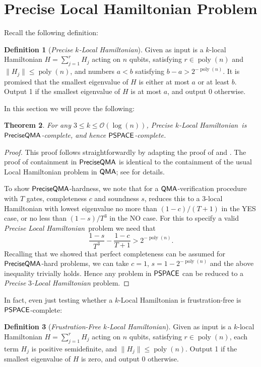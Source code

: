 \documentclass[11pt]{article}
\newtheorem{theorem}{Theorem}
\theoremstyle{definition}
\newtheorem{definition}[theorem]{Definition}
\theoremstyle{remark}
\newcommand\QMA{{\sf{QMA}}}
\newcommand\PSPACE{{\sf{PSPACE}}}
\newcommand\preciseQMA{{\sf{PreciseQMA}}}
\newcommand\preciselh{\textit{Precise Local Hamiltonian}}
\newcommand\preciseklh{\textit{Precise }$k$\textit{-Local Hamiltonian}}
\newcommand\preciseilh[1]{\textit{Precise }\ensuremath{#1}\textit{-Local Hamiltonian}}
\DeclareMathOperator{\poly}{poly}
\begin{document}
\section{Precise Local Hamiltonian Problem}\label{app:localhamiltonian}
Recall the following definition:
\begingroup
\def\thedefinition{\ref{def: precise local hamiltonian}}
\begin{definition}[\preciseklh]
Given as input is a $k$-local Hamiltonian $H=\sum_{j=1}^rH_j$ acting on $n$ qubits, satisfying $r \in \poly(n)$ and $\|H_j\| \le \poly(n)$, and numbers $a < b$ satisfying $b - a > 2^{-\poly(n)}$. It is promised that the smallest eigenvalue of $H$ is either at most $a$ or at least $b$. Output 1 if the smallest eigenvalue of $H$ is at most $a$, and output 0 otherwise.
\end{definition}
\endgroup
In this section we will prove the following:
\begingroup
\def\thetheorem{\ref{thm: precise local hamiltonian}}
\begin{theorem}
For any $3 \le k \le \mathcal{O}(\log(n))$, \preciseklh \ is $\preciseQMA$-complete, and hence $\PSPACE$-complete.
\end{theorem}
\endgroup
\begin{proof}
This proof follows straightforwardly by adapting the proof of \cite{ksv02} and \cite{kr03}. The proof of containment in $\preciseQMA$ is identical to the containment of the usual Local Hamiltonian problem in $\QMA$; see \cite{ksv02} for details.

To show $\preciseQMA$-hardness, we note that for a $\QMA$-verification procedure with $T$ gates, completeness $c$ and soundness $s$, \cite{kr03} reduces this to a 3-local Hamiltonian with lowest eigenvalue no more than $(1-c) / (T+1)$ in the YES case, or no less than $(1-s) / T^3$ in the NO case. For this to specify a valid \preciselh \ problem we need that
\begin{equation} \label{eq:preciselh_condition}
\frac{1-s}{T^3} - \frac{1-c}{T+1} > 2^{-\poly(n)}.
\end{equation}
Recalling that we showed that perfect completeness can be assumed for $\preciseQMA$-hard problems, we can take $c=1$, $s = 1-2^{-\poly(n)}$ and the above inequality trivially holds. Hence any problem in $\PSPACE$ can be reduced to a \preciseilh{3} problem.
\end{proof}
In fact, even just testing whether a $k$-Local Hamiltonian is frustration-free is $\PSPACE$-complete:\begin{definition} [\emph{Frustration-Free $k$-Local Hamiltonian}] Given as input is a $k$-local Hamiltonian $H=\sum_{j=1}^rH_j$ acting on $n$ qubits, satisfying $r \in \poly(n)$, each term $H_j$ is positive semidefinite, and $\|H_j\| \le \poly(n)$. Output 1 if the smallest eigenvalue of $H$ is zero, and output 0 otherwise.
\end{definition}
\end{document}

